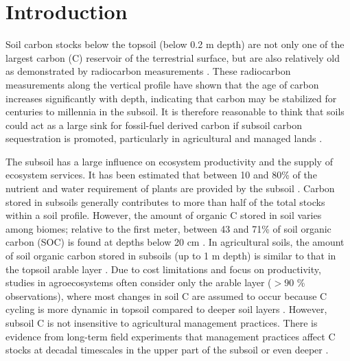 \documentclass[11pt, oneside, a4paper]{article}   	%
\begin{document}
\tableofcontents

\newpage

\section{Introduction}
Soil carbon stocks below the topsoil (below  0.2 m depth) are not only one of the largest carbon (C) reservoir of the terrestrial surface, but are also relatively old as demonstrated by radiocarbon measurements \citep{Mathieu2015, He2016, Shi2020, Heckman2022}. These radiocarbon measurements along the vertical profile have shown that the age of carbon increases significantly with depth, indicating that carbon may be stabilized for centuries to millennia in the subsoil. It is therefore reasonable to think that soils could act as a large sink for fossil-fuel derived carbon if subsoil carbon sequestration is promoted, particularly in agricultural and managed lands \citep{Rumpel2012, Button2022}. 

The subsoil has a large influence on ecosystem productivity and the supply of ecosystem services. It has been estimated that between 10 and 80\% of the nutrient and water requirement of plants are provided by the subsoil \citep{Hinzmann2021}. Carbon stored in subsoils generally contributes to more than half of the total stocks within a soil profile. However, the amount of organic C stored in soil varies among biomes; relative to the first meter, between 43 and 71\% of soil organic carbon (SOC) is found at depths below 20 cm \citep{Jobbagy2000}. In agricultural soils, the amount of soil organic carbon stored in subsoils (up to 1 m depth) is similar to that in the topsoil arable layer \citep{Morari2019}. Due to cost limitations and focus on productivity, studies in agroecosystems often consider only the arable layer ($>90$ \% observations), where most changes in soil C are assumed to occur because C cycling is more dynamic in topsoil compared to deeper soil layers \citep{Bolinder2020}. However, subsoil C is not insensitive to agricultural management practices. There is evidence from long-term field experiments that management practices affect C stocks at decadal timescales in the upper part of the subsoil or even deeper \citep[e.g.][]{Kirchmann2013, Kaetterer2014, Menichetti2015, Borjesson2018, DalFerro2020, Slessarev2020}.
\end{document}
